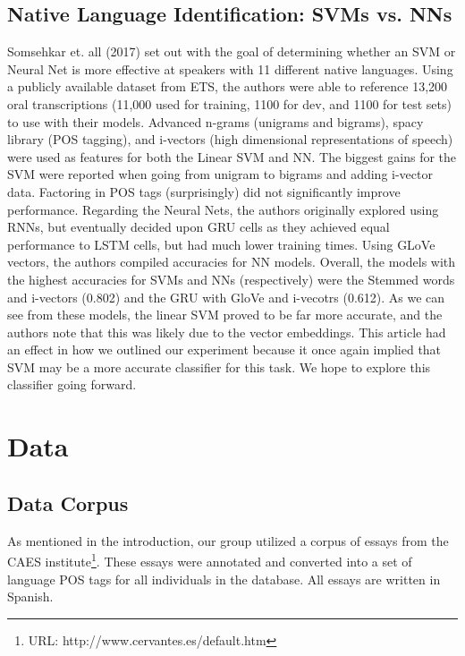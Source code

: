 \documentclass[12pt]{article}
\newcommand\tab[1][1cm]{\hspace*{#1}}
\begin{document}
 \subsection{Native Language Identification: SVMs vs. NNs}
 \tab Somsehkar et. all (2017) set out with the goal of determining whether an SVM or Neural Net is more effective at speakers with 11 different native languages. Using a publicly available dataset from ETS, the authors were able to reference 13,200 oral transcriptions (11,000 used for training, 1100 for dev, and 1100 for test sets) to use with their models. Advanced n-grams (unigrams and bigrams), spacy library (POS tagging), and i-vectors (high dimensional representations of speech) were used as features for both the Linear SVM and NN. The biggest gains for the SVM were reported when going from unigram to bigrams and adding i-vector data. Factoring in POS tags (surprisingly) did not significantly improve performance. Regarding the Neural Nets, the authors originally explored using RNNs, but eventually decided upon GRU cells as they achieved equal performance to LSTM cells, but had much lower training times. Using GLoVe vectors, the authors compiled accuracies for NN models. Overall, the models with the highest accuracies for SVMs and NNs (respectively) were the Stemmed words and i-vectors (0.802) and the GRU with GloVe and i-vecotrs (0.612). As we can see from these models, the linear SVM proved to be far more accurate, and the authors note that this was likely due to the vector embeddings. This article had an effect in how we outlined our experiment because it once again implied that SVM may be a more accurate classifier for this task. We hope to explore this classifier going forward.
 \section{Data}
 \subsection{Data Corpus}
 \tab As mentioned in the introduction, our group utilized a corpus of essays from the CAES institute\footnote{URL: http://www.cervantes.es/default.htm}. These essays were annotated and converted into a set of language POS tags for all individuals in the database. All essays are written in Spanish. 
\end{document}
